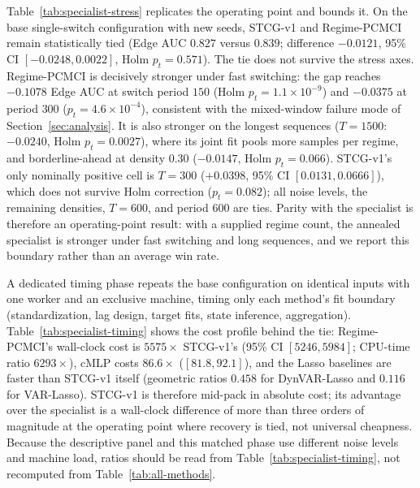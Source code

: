 \documentclass[sigconf,anonymous]{acmart}
\begin{document}
Table~\ref{tab:specialist-stress} replicates the operating point and bounds it.
On the base single-switch configuration with new seeds, STCG-v1 and Regime-PCMCI remain statistically tied (Edge AUC $0.827$ versus $0.839$; difference $-0.0121$, 95\% CI $[-0.0248, 0.0022]$, Holm $p_t=0.571$).
The tie does not survive the stress axes.
Regime-PCMCI is decisively stronger under fast switching: the gap reaches $-0.1078$ Edge AUC at switch period $150$ (Holm $p_t=1.1\times10^{-9}$) and $-0.0375$ at period $300$ ($p_t=4.6\times10^{-4}$), consistent with the mixed-window failure mode of Section~\ref{sec:analysis}.
It is also stronger on the longest sequences ($T{=}1500$: $-0.0240$, Holm $p_t=0.0027$), where its joint fit pools more samples per regime, and borderline-ahead at density $0.30$ ($-0.0147$, Holm $p_t=0.066$).
STCG-v1's only nominally positive cell is $T{=}300$ ($+0.0398$, 95\% CI $[0.0131, 0.0666]$), which does not survive Holm correction ($p_t=0.082$); all noise levels, the remaining densities, $T{=}600$, and period $600$ are ties.
Parity with the specialist is therefore an operating-point result: with a supplied regime count, the annealed specialist is stronger under fast switching and long sequences, and we report this boundary rather than an average win rate.

\begin{table}[t]
\caption{Dedicated matched timing on the base switching configuration (fresh seeds 100--119, one worker, exclusive machine, fit boundary only). Ratios are geometric means of opponent over STCG-v1 per-seed fit times with 95\% CIs. The base condition is noise-free, whereas Table~\ref{tab:all-methods}'s fit times come from the noise-0.10 descriptive panel; the two protocols should not be mixed. Ratios collected inside the concurrent stress grid are descriptive-only and excluded.}
\label{tab:specialist-timing}
\centering
\small
\resizebox{\linewidth}{!}{}
\end{table}

A dedicated timing phase repeats the base configuration on identical inputs with one worker and an exclusive machine, timing only each method's fit boundary (standardization, lag design, target fits, state inference, aggregation).
Table~\ref{tab:specialist-timing} shows the cost profile behind the tie: Regime-PCMCI's wall-clock cost is $5575\times$ STCG-v1's (95\% CI $[5246, 5984]$; CPU-time ratio $6293\times$), cMLP costs $86.6\times$ ($[81.8, 92.1]$), and the Lasso baselines are faster than STCG-v1 itself (geometric ratios $0.458$ for DynVAR-Lasso and $0.116$ for VAR-Lasso).
STCG-v1 is therefore mid-pack in absolute cost; its advantage over the specialist is a wall-clock difference of more than three orders of magnitude at the operating point where recovery is tied, not universal cheapness. Because the descriptive panel and this matched phase use different noise levels and machine load, ratios should be read from Table~\ref{tab:specialist-timing}, not recomputed from Table~\ref{tab:all-methods}.
\end{document}
